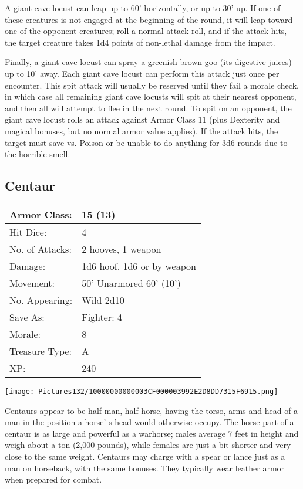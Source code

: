 \documentclass[a4paper,twoside,openany,10pt]{book}
\begin{document}
\begin{multicols}{2}
A giant cave locust can leap up to 60' horizontally, or up to 30' up. If one of these creatures is not engaged at the beginning of the round, it will leap toward one of the opponent creatures; roll a normal attack roll, and if the attack hits, the target creature takes 1d4 points of non-lethal damage from the impact.

Finally, a giant cave locust can spray a greenish-brown goo (its digestive juices) up to 10' away. Each giant cave locust can perform this attack just once per encounter. This spit attack will usually be reserved until they fail a morale check, in which case all remaining giant cave locusts will spit at their nearest opponent, and then all will attempt to flee in the next round. To spit on an opponent, the giant cave locust rolls an attack against Armor Class 11 (plus Dexterity and magical bonuses, but no normal armor value applies). If the attack hits, the target must save vs. Poison or be unable to do anything for 3d6 rounds due to the horrible smell.

\subsection*{Centaur}\label{centaur}

\begin{tabularx}{0.48\textwidth}{@{}lX@{}}
Armor Class: & 15 (13) \\\hline
Hit Dice: & 4 \\\hline
No. of Attacks: & 2 hooves, 1 weapon \\\hline
Damage: & 1d6 hoof, 1d6 or by weapon \\\hline
Movement: & 50' Unarmored 60'
(10') \\\hline
No. Appearing: & Wild 2d10 \\\hline
Save As: & Fighter: 4 \\\hline
Morale: & 8 \\\hline
Treasure Type: & A \\\hline
XP: & 240 \\\hline
\end{tabularx}\medskip


\begin{center}
	\texttt{[image: Pictures132/10000000000003CF000003992E2D8DD7315F6915.png]}
\end{center}\medskip

Centaurs appear to be half man, half horse, having the torso, arms and head of a man in the position a horse' s head would otherwise occupy. The horse part of a centaur is as large and powerful as a warhorse; males average 7 feet in height and weigh about a ton (2,000 pounds), while females are just a bit shorter and very close to the same weight. Centaurs may charge with a spear or lance just as a man on horseback, with the same bonuses. They typically wear leather armor when prepared for combat.


\end{multicols}
\end{document}
